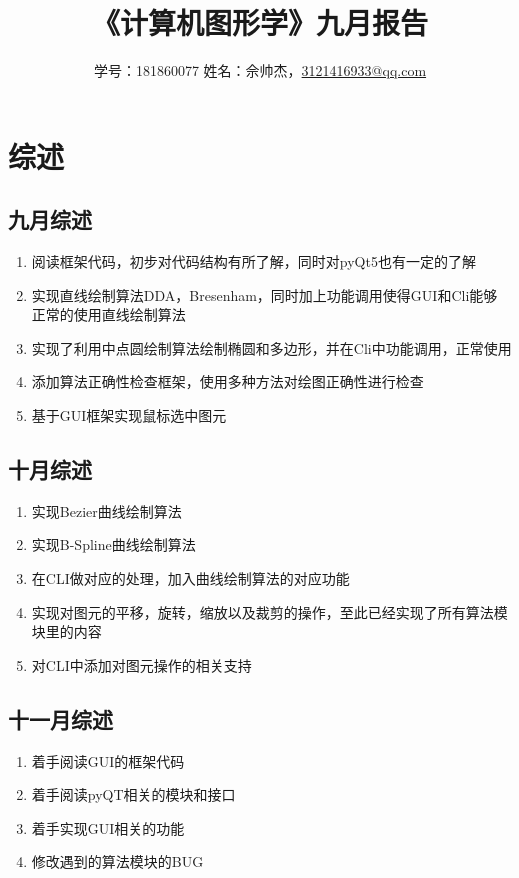 \documentclass[a4paper,UTF8]{article}
\theoremstyle{definition}
\begin{document}
\title{\textbf{《计算机图形学》九月报告}}
\author{学号：181860077 姓名：佘帅杰，\href{mailto:3121416933@qq.com}{3121416933@qq.com}}
\maketitle

\section{综述}
\subsection{九月综述}
\begin{enumerate}
    \item 阅读框架代码，初步对代码结构有所了解，同时对pyQt5也有一定的了解
    
    \item 实现直线绘制算法DDA，Bresenham，同时加上功能调用使得GUI和Cli能够
    正常的使用直线绘制算法
    
    \item 实现了利用中点圆绘制算法绘制椭圆和多边形，并在Cli中功能调用，正常使用

    \item 添加算法正确性检查框架，使用多种方法对绘图正确性进行检查
    
    \item 基于GUI框架实现鼠标选中图元
\end{enumerate}

\subsection{十月综述}
\begin{enumerate}
    \item 实现Bezier曲线绘制算法
    
    \item 实现B-Spline曲线绘制算法
    
    \item 在CLI做对应的处理，加入曲线绘制算法的对应功能

    \item 实现对图元的平移，旋转，缩放以及裁剪的操作，至此已经实现了所有算法模块里的内容
    
    \item 对CLI中添加对图元操作的相关支持
\end{enumerate}

\subsection{十一月综述}
\begin{enumerate}
    \item 着手阅读GUI的框架代码
    
    \item 着手阅读pyQT相关的模块和接口
    
    \item 着手实现GUI相关的功能
    
    \item 修改遇到的算法模块的BUG
\end{enumerate}
\end{document}
